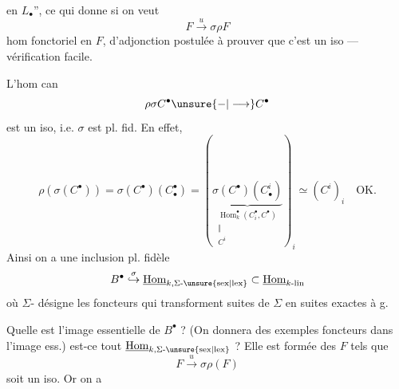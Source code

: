 en $L_\bullet$'', ce qui donne si on veut
\[
F\xrightarrow{u}\sigma\rho F
\]
hom fonctoriel en $F$, \uline{}  
d'adjonction postulée
à prouver que c'est un iso --- vérification
facile.

L'hom can
\[
\rho\sigma C^\bullet\unsure{-|\longrightarrow}C^\bullet
\]
est un iso, i.e. $\sigma$ est pl. fid. En effet,
\[
\rho(\sigma(C^\bullet))=\sigma(C^\bullet)(C_\bullet^\bullet)
=\left(\underbrace{\sigma(C^\bullet)(C_\bullet^i)}_{\substack{
\operatorname{Hom}_k^\bullet(C_i^\bullet,C^\bullet)\\\Vert\\C^i}}
\right)_i\simeq(C^i)_i\quad\mathrm{OK}.
\]
Ainsi on a une inclusion pl. fidèle
\[
B^\bullet\mathrel{\mathop{\hookrightarrow}\limits^{\sigma}}\underline{\operatorname{Hom}}_{k,\Sigma\text{-\unsure{sex|lex}}}
\subset\underline{\operatorname{Hom}}_{k\text{-lin}}
\]
où $\Sigma$- désigne les foncteurs qui transforment
suites de $\Sigma$ en suites exactes à g.

Quelle est l'image essentielle de $B^\bullet$ ?
(On donnera des exemples 
foncteurs dans l'image ess.) est-ce tout
$\underline{\operatorname{Hom}}_{k,\Sigma\text{-\unsure{sex|lex}}}$ ? Elle est formée des $F$
tels que
\[
F\xrightarrow{u}\sigma\rho(F)
\]
soit un iso. Or on a

